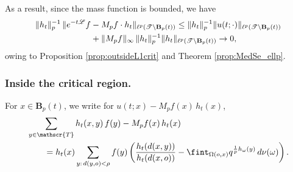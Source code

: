 \documentclass[11pt,a4paper,reqno]{amsart}
\renewcommand\mathcal{\mathscr}
\theoremstyle{plain}
\theoremstyle{remark}
\theoremstyle{definition}
\theoremstyle{remark}
\numberwithin{equation}{section}
\begin{document}
	
	As a result, since the mass function is bounded, we have
	\begin{align}
	\|h_t\|_p^{-1}\, \|e^{-t\mathcal{L}}f  &- M_pf\cdot h_t\|_{\ell^p(\mathcal{T}\setminus \textbf{B}_p(t))}
		\leq \|h_t\|_p^{-1}
		\|u(t; \cdot)\|_{\ell^p(\mathcal{T}\setminus \textbf{B}_p(t))} \notag\\
		&+\|M_pf\|_{\infty}\,\|h_t\|_p^{-1}
		\|h_t\|_{\ell^p(\mathcal{T}\setminus \textbf{B}_p(t))}\to 0, \label{eq:conv_out_ell1}
	\end{align}
	owing to  Proposition \ref{prop:outsideL1crit} and Theorem \ref{prop:MedSe_ellp}.
	
	\subsubsection{Inside the critical region.} 	For $x \in \textbf{B}_p(t)$, we write  for $u(t;x)-M_pf(x)\,h_t(x)$,
	\begin{align}
		&\sum_{y\in \mathcal{T}} h_t(x,y) \,f(y)-M_pf(x)\, h_t(x) \notag \\
		&\qquad
		=h_t(x)
		\sum_{y:\, d(y,o)<\rho}
		f(y) \left( \frac{h_t(d(x,y))}{h_t(d(x,o))}-\fint_{\Omega(o,x)}q^{\frac{1}{p}h_{\omega}(y)}\, 
		d\nu(\omega) \right). \label{eq:ell1diff}
	\end{align}
	
\end{document}
